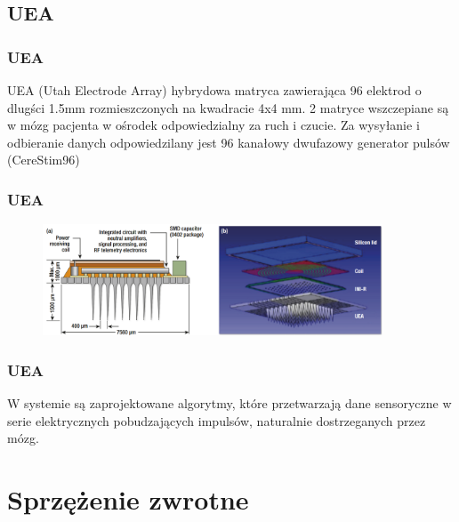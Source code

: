 \documentclass[8pt]{beamer}
\begin{document}
\subsection{UEA}
\begin{frame}
\frametitle{UEA}
UEA (Utah Electrode Array) hybrydowa matryca zawierająca 96 elektrod o dlugści 1.5mm rozmieszczonych na kwadracie 4x4 mm.
2 matryce wszczepiane są w mózg pacjenta w ośrodek odpowiedzialny za ruch i czucie. Za wysyłanie i odbieranie danych odpowiedzilany jest
96 kanałowy dwufazowy generator pulsów (CereStim96)
\end{frame}	
\begin{frame}
\frametitle{UEA}
\begin{figure}[htbp]
  \begin{center}
    \includegraphics[width=0.9\textwidth]{graphics/UEA2.png}
  \end{center}
 \end{figure} 
\end{frame}
\begin{frame}
\frametitle{UEA}
W systemie są zaprojektowane algorytmy, które przetwarzają dane sensoryczne w serie elektrycznych pobudzających impulsów, naturalnie dostrzeganych przez mózg.
\end{frame}
\section{Sprzężenie zwrotne}
\end{document}
